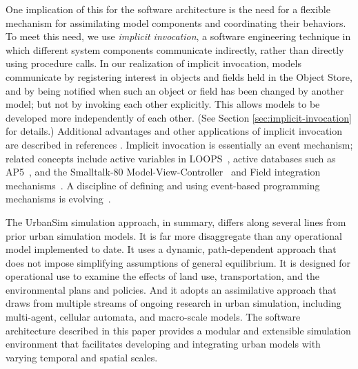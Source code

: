 One 
implication of this for the software architecture is the need for a flexible
mechanism for assimilating model components and coordinating their
behaviors.  To meet this need, we use
\emph{implicit invocation},  
a software engineering technique in which different system components
communicate indirectly, rather than directly using procedure calls.  In our
realization of implicit invocation,
models communicate by registering
interest in objects and fields held in the Object Store, and by
being notified when such an object or field has been changed by
another model; but not by invoking each other explicitly.
This allows models to be developed more independently of each other.
(See Section \ref{sec:implicit-invocation} for details.)
Additional advantages and other applications of
implicit invocation are described in references
\citet{garland-aske-1993,sullivan-tse-1992,sullivan-tse-1996}.
Implicit invocation is essentially an event mechanism; related
concepts include active variables in
LOOPS~\citep{stefik-software-1986}, active databases such as
AP5~\citep{cohen-sigmod-1989}, and the Smalltalk-80
Model-View-Controller~\citep{krasner-joop-1988} and Field
integration mechanisms~\citep{reiss-book-1994}.  A discipline of
defining and using event-based programming mechanisms is
evolving~\citep{barrett-tse-1996,carzinga-saw-1998,
garlan-vdm-1991}.

The UrbanSim simulation approach, in summary, differs along
several lines from prior urban simulation models.  It is far more
disaggregate than any operational model implemented to date.  It
uses a dynamic, path-dependent approach that does not impose
simplifying assumptions of general equilibrium.  It is designed
for operational use to examine the effects of land use,
transportation, and the environmental plans and policies. And it
adopts an assimilative approach that draws from multiple streams
of ongoing research in urban simulation, including multi-agent,
cellular automata, and macro-scale models. The software
architecture described in this paper provides a modular and
extensible simulation environment that facilitates developing and
integrating urban models with varying temporal and spatial scales.

